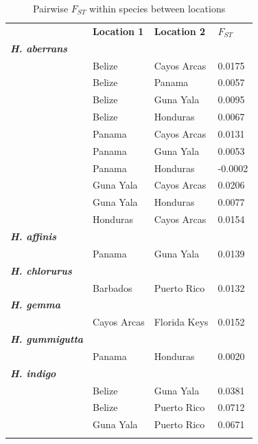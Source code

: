 \begin{xltabular}{\textwidth}{p{5cm}XXX}
\label{tab:s3}
\captionsetup{justification=justified}
\caption{Pairwise $F_{ST}$ within species between locations}
\\
    \hline
    \addlinespace
     & \textbf{Location 1} & \textbf{Location 2} & \textbf{$F_{ST}$} \\
    \addlinespace
    \hline \hline
    \textbf{\emph{H. aberrans}} & & & \\
    \hline
    \hline
     & Belize & Cayos Arcas & 0.0175\\
     & Belize & Panama & 0.0057\\
     & Belize & Guna Yala & 0.0095\\
     & Belize & Honduras & 0.0067\\
     & Panama & Cayos Arcas & 0.0131\\
     & Panama & Guna Yala & 0.0053\\
     & Panama & Honduras & -0.0002\\
     & Guna Yala & Cayos Arcas & 0.0206\\
     & Guna Yala & Honduras & 0.0077\\
     & Honduras & Cayos Arcas & 0.0154\\
    \addlinespace
    \hline
    \hline
    \textbf{\emph{H. affinis}} & & & \\
    \hline
    \hline
    & Panama & Guna Yala & 0.0139\\
    \addlinespace
    \hline
    \hline
    \textbf{\emph{H. chlorurus}} & & & \\
    \hline
    \hline
    & Barbados & Puerto Rico & 0.0132\\
    \addlinespace
    \hline
    \hline
    \textbf{\emph{H. gemma}} & & &  \\
    \hline
    \hline
    & Cayos Arcas & Florida Keys & 0.0152\\
    \addlinespace
    \hline
    \hline
    \textbf{\emph{H. gummigutta}} &  &  &  \\
    \hline
    \hline    
    & Panama & Honduras & 0.0020\\
    \addlinespace
    \hline
    \hline
    \textbf{\emph{H. indigo}} &  & &  \\
    \hline
    \hline
    & Belize & Guna Yala & 0.0381\\
    & Belize & Puerto Rico & 0.0712\\
    & Guna Yala & Puerto Rico & 0.0671\\
    \addlinespace
    \hline

\end{xltabular}

